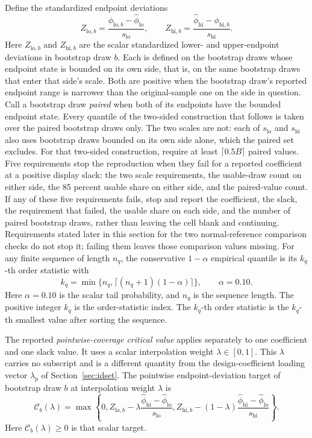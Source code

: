 \documentclass[11pt]{article}
\begin{document}
Define the standardized endpoint deviations
\begin{equation*}
 Z_{\mathrm{lo},b}=\frac{\phi_{\mathrm{lo},b}-\widehat\phi_{\mathrm{lo}}}{s_{\mathrm{lo}}},\qquad
 Z_{\mathrm{hi},b}=\frac{\widehat\phi_{\mathrm{hi}}-\phi_{\mathrm{hi},b}}{s_{\mathrm{hi}}}.
\end{equation*}
Here \(Z_{\mathrm{lo},b}\) and \(Z_{\mathrm{hi},b}\) are the scalar standardized lower- and
upper-endpoint deviations in bootstrap draw \(b\). Each is defined on the bootstrap draws whose
endpoint state is bounded on its own side, that is, on the same bootstrap draws that enter that side's
scale. Both are positive when the bootstrap draw's reported endpoint range is narrower than the
original-sample one on the side in question. Call a bootstrap draw \emph{paired} when both of its
endpoints have the bounded endpoint state. Every quantile of the two-sided construction that follows
is taken over the paired bootstrap draws only. The two scales are not: each of
\(s_{\mathrm{lo}}\) and \(s_{\mathrm{hi}}\) also uses bootstrap draws bounded on its own side alone,
which the paired set excludes. For that two-sided construction, require at least
\(\lceil0.5B\rceil\) paired values. Five requirements stop the reproduction when they fail for a
reported coefficient at a positive display slack: the two scale requirements, the usable-draw count
on either side, the 85 percent usable share on either side, and the paired-value count. If any of
these five requirements fails, stop and report the coefficient, the slack, the requirement that failed, the usable share on
each side, and the number of paired bootstrap draws, rather than leaving the cell blank and
continuing. Requirements stated later in this section for the two normal-reference comparison checks do not
stop it; failing them leaves those comparison values missing. For any finite sequence of length \(n_q\), the
conservative \(1-\alpha\) empirical quantile is its \(k_q\)-th order statistic with
\begin{equation}
 k_q=\min\{n_q,\lceil(n_q+1)(1-\alpha)\rceil\},
 \qquad \alpha=0.10.
 \label{eq:conservative-order}
\end{equation}
Here \(\alpha=0.10\) is the scalar tail probability, and \(n_q\) is the sequence length. The
positive integer \(k_q\) is the order-statistic index. The \(k_q\)-th order statistic is the
\(k_q\)-th smallest value after sorting the sequence.

The reported
\emph{pointwise-coverage critical value} applies separately to one coefficient and one slack value.
It uses a scalar interpolation weight \(\lambda\in[0,1]\). This \(\lambda\) carries no subscript and
is a different quantity from the design-coefficient loading vector \(\lambda_p\) of
Section~\ref{sec:idset}. The pointwise endpoint-deviation target of bootstrap draw \(b\) at
interpolation weight \(\lambda\) is
\begin{equation*}
 \mathcal C_b(\lambda)=\max\left\{0,
 Z_{\mathrm{lo},b}-\lambda\frac{\widehat\phi_{\mathrm{hi}}-\widehat\phi_{\mathrm{lo}}}{s_{\mathrm{lo}}},
 Z_{\mathrm{hi},b}-(1-\lambda)\frac{\widehat\phi_{\mathrm{hi}}-\widehat\phi_{\mathrm{lo}}}{s_{\mathrm{hi}}}\right\}.
\end{equation*}
Here \(\mathcal C_b(\lambda)\ge0\) is that scalar target.
\end{document}
